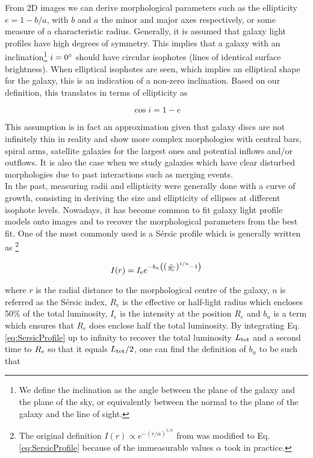 From 2D images we can derive morphological parameters such as the ellipticity $e = 1 - b/a$, with $b$ and $a$ the minor and major axes respectively, or some measure of a characteristic radius. Generally, it is assumed that galaxy light profiles have high degrees of symmetry. This implies that a galaxy with an inclination\footnote{We define the inclination as the angle between the plane of the galaxy and the plane of the sky, or equivalently between the normal to the plane of the galaxy and the line of sight.} $i = 0 \degree$ should have circular isophotes (lines of identical surface brightness). When elliptical isophotes are seen, which implies an elliptical shape for the galaxy, this is an indication of a non-zero inclination. Based on our definition, this translates in terms of ellipticity as

\begin{equation}
	\cos i = 1 - e
	\label{eq:inclinaison}
\end{equation}

This assumption is in fact an approximation given that galaxy discs are not infinitely thin in reality and show more complex morphologies with central bars, spiral arms, satellite galaxies for the largest ones and potential inflows and/or outflows. It is also the case when we study galaxies which have clear disturbed morphologies due to past interactions such as merging events.  \\

In the past, measuring radii and ellipticity were generally done with a curve of growth, consisting in deriving the size and ellipticity of ellipses at different isophote levels. Nowadays, it has become common to fit galaxy light profile models onto images and to recover the morphological parameters from the best fit. One of the most commonly used is a Sérsic profile which is generally written as \footnote{The original definition $I(r) \propto e^{-(r/\alpha)^{1/n}}$ from  was modified to Eq.\,\ref{eq:SersicProfile} because of the immeasurable values $\alpha$ took in practice.} 

\begin{equation}
    \label{eq:SersicProfile}
    I(r) = I_{\rm{e}} e^{ - b_n \left ( \left  ( \frac{r}{R_{\rm{e}}}  \right )^{1/n} - 1 \right ) }
\end{equation}

where $r$ is the radial distance to the morphological centre of the galaxy, $n$ is referred as the Sérsic index, $R_e$ is the effective or half-light radius which encloses 50\% of the total luminosity, $I_e$ is the intensity at the position $R_e$ and $b_n$ is a term which ensures that $R_e$ does enclose half the total luminosity. By integrating Eq.\,\ref{eq:SersicProfile} up to infinity to recover the total luminosity $L_{\rm{tot}}$ and a second time to $R_{\rm{e}}$ so that it equals $L_{\rm{tot}}/2$, one can find the definition of $b_n$ to be such that 

